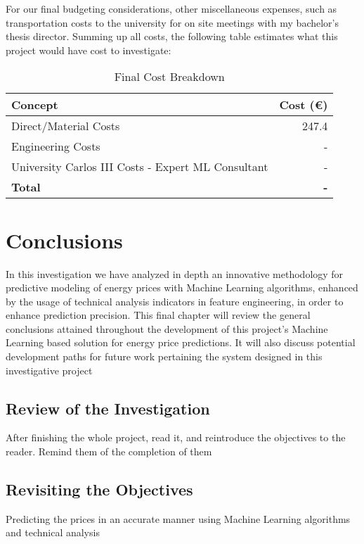 \documentclass[12pt]{report} %
\begin{document}
For our final budgeting considerations, other miscellaneous expenses, such as transportation costs to the university for on site meetings with my bachelor's thesis director. Summing up all costs, the following table estimates what this project would have cost to investigate:

\begin{table}[H]
    \caption{Final Cost Breakdown}
    \centering
    \begin{tabular}{|l|r|}
        \hline
        \textbf{Concept} & \textbf{Cost (€)} \\
        \hline
        Direct/Material Costs & 247.4 \\
        Engineering Costs & - \\
        University Carlos III Costs - Expert ML Consultant & - \\
        \hline
        \textbf{Total} & \textbf{-} \\
        \hline
    \end{tabular}
\end{table}



\chapter{Conclusions}
In this investigation we have analyzed in depth an innovative methodology for predictive modeling of energy prices with Machine Learning algorithms, enhanced by the usage of technical analysis indicators in feature engineering, in order to enhance prediction precision. This final chapter will review the general conclusions attained throughout the development of this project's Machine Learning based solution for energy price predictions. It will also discuss potential development paths for future work pertaining the system designed in this investigative project

\section{Review of the Investigation} %
After finishing the whole project, read it, and reintroduce the objectives to the reader. Remind them of the completion of them

\section{Revisiting the Objectives}
Predicting the prices in an accurate manner using Machine Learning algorithms and technical analysis
\end{document}
